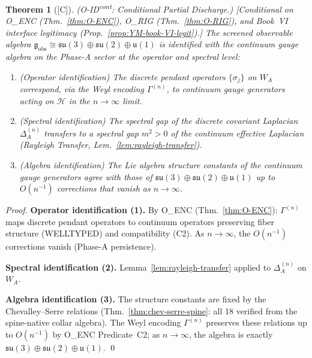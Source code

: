 \documentclass[12pt,oneside]{amsbook}
\theoremstyle{plain}
\newtheorem{theorem}{Theorem}[section]
\theoremstyle{definition}
\theoremstyle{remark}
\newcommand{\status}[1]{\textup{[#1]}}
\begin{document}
\begin{theorem}[\status{C}]\label{thm:O-ID-cont-partial}
\textup{(O-ID\textsuperscript{cont}: Conditional Partial Discharge.)}
\textup{[Conditional on O\_ENC (Thm.~\ref{thm:O-ENC}), O\_RIG
(Thm.~\ref{thm:O-RIG}), and Book~VI interface legitimacy
(Prop.~\ref{prop:YM-book-VI-legit}).]}
The screened observable algebra
$\mathfrak{g}_{\mathrm{obs}} \cong
\mathfrak{su}(3)\oplus\mathfrak{su}(2)\oplus\mathfrak{u}(1)$
is identified with the continuum gauge algebra on the Phase-A
sector at the operator and spectral level:
\begin{enumerate}[label=\textup{(\arabic*)}]
 \item (\emph{Operator identification}) The discrete pendant
 operators $\{\sigma_j\}$ on $W_A$ correspond, via the Weyl
 encoding $\Gamma^{(n)}$, to continuum gauge generators
 acting on $\mathcal{H}$ in the $n \to \infty$ limit.
 \item (\emph{Spectral identification}) The spectral gap of
 the discrete covariant Laplacian $\Delta_A^{(n)}$ transfers
 to a spectral gap $m^2 > 0$ of the continuum effective
 Laplacian (Rayleigh Transfer, Lem.~\ref{lem:rayleigh-transfer}).
 \item (\emph{Algebra identification}) The Lie algebra structure
 constants of the continuum gauge generators agree with those
 of $\mathfrak{su}(3)\oplus\mathfrak{su}(2)\oplus\mathfrak{u}(1)$
 up to $O(n^{-1})$ corrections that vanish as $n \to \infty$.
\end{enumerate}
\end{theorem}

\begin{proof}
\textbf{Operator identification (1).}
By O\_ENC (Thm.~\ref{thm:O-ENC}): $\Gamma^{(n)}$ maps discrete
pendant operators to continuum operators preserving fiber structure
(WELLTYPED) and compatibility (C2). As $n \to \infty$, the
$O(n^{-1})$ corrections vanish (Phase-A persistence).

\textbf{Spectral identification (2).}
Lemma~\ref{lem:rayleigh-transfer} applied to
$\Delta_A^{(n)}$ on $W_A$.

\textbf{Algebra identification (3).}
The structure constants are fixed by the Chevalley--Serre relations
(Thm.~\ref{thm:chev-serre-spine}: all 18 verified from the
spine-native collar algebra). The Weyl encoding $\Gamma^{(n)}$
preserves these relations up to $O(n^{-1})$ by O\_ENC Predicate~C2;
as $n \to \infty$, the algebra is exactly
$\mathfrak{su}(3)\oplus\mathfrak{su}(2)\oplus\mathfrak{u}(1)$. \qed
\end{proof}
\end{document}
